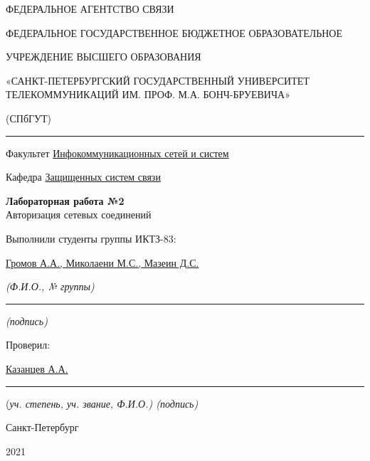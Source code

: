 \documentclass[a4paper,14pt]{extarticle}
\begin{document}
    \begin{center}
        \thispagestyle{empty}
        \begin{singlespace}
        ФЕДЕРАЛЬНОЕ АГЕНТСТВО СВЯЗИ

        ФЕДЕРАЛЬНОЕ ГОСУДАРСТВЕННОЕ БЮДЖЕТНОЕ ОБРАЗОВАТЕЛЬНОЕ

        УЧРЕЖДЕНИЕ ВЫСШЕГО ОБРАЗОВАНИЯ

        «САНКТ-ПЕТЕРБУРГСКИЙ ГОСУДАРСТВЕННЫЙ УНИВЕРСИТЕТ ТЕЛЕКОММУНИКАЦИЙ ИМ. ПРОФ. М.А. БОНЧ-БРУЕВИЧА»

        (СПбГУТ)
        \end{singlespace}
        \vspace{-1ex}
        \rule{\textwidth}{0.4pt}
        \vspace{-5ex}

        Факультет \underline{Инфокоммуникационных сетей и систем}

        Кафедра \underline{Защищенных систем связи}
        \vspace{10ex}

        \textbf{Лабораторная работа №2}\\
        Авторизация сетевых соединений
        


    \end{center}
    \vspace{4ex}
    \begin{flushright}
    \parbox{10 cm}{
    \begin{flushleft}
        Выполнили студенты группы ИКТЗ-83:

        \underline{Громов А.А., Миколаени М.С., Мазеин Д.С.} \hfill 

        \footnotesize \textit{ (Ф.И.О., № группы)} \hfill \rule[-0.85ex]{0.1\textwidth}{0.6pt}
        
        \hfill \textit{(подпись)} \normalsize

        Проверил:

        \underline{Казанцев А.А.} \hfill \rule[-0.85ex]{0.1\textwidth}{0.6pt}

        (\footnotesize \textit{уч. степень, уч. звание, Ф.И.О.) \hfill (подпись)} \normalsize

    \end{flushleft}
    }
    \end{flushright}
    \begin{center}
        \vfill
        Санкт-Петербург

        2021

    \end{center}
    \newpage
\end{document}
